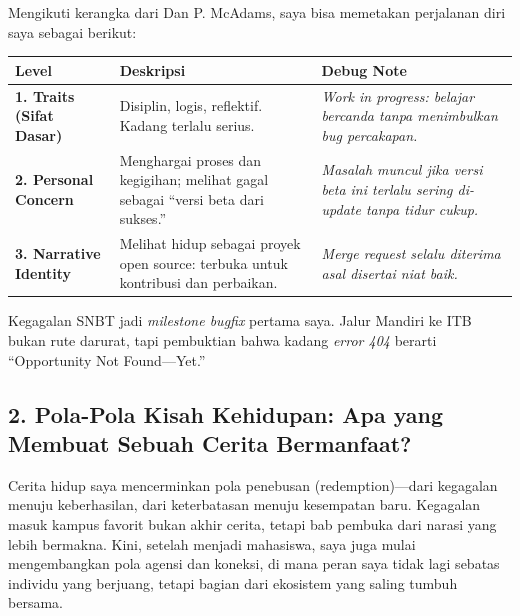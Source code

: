 \documentclass[
  letterpaper,
  DIV=11,
  numbers=noendperiod]{scrreprt}
\begin{document}
Mengikuti kerangka dari Dan P. McAdams, saya bisa memetakan perjalanan
diri saya sebagai berikut:

\begin{longtable}[]{@{}
  >{\raggedright\arraybackslash}p{}
  >{\raggedright\arraybackslash}p{}
  >{\raggedright\arraybackslash}p{}@{}}
\toprule\noalign{}
\begin{minipage}[b]{\linewidth}\raggedright
Level
\end{minipage} & \begin{minipage}[b]{\linewidth}\raggedright
Deskripsi
\end{minipage} & \begin{minipage}[b]{\linewidth}\raggedright
Debug Note
\end{minipage} \\
\midrule\noalign{}
\endhead
\bottomrule\noalign{}
\endlastfoot
\textbf{1. Traits (Sifat Dasar)} & Disiplin, logis, reflektif. Kadang
terlalu serius. & \emph{Work in progress: belajar bercanda tanpa
menimbulkan bug percakapan.} \\
\textbf{2. Personal Concern} & Menghargai proses dan kegigihan; melihat
gagal sebagai ``versi beta dari sukses.'' & \emph{Masalah muncul jika
versi beta ini terlalu sering di-update tanpa tidur cukup.} \\
\textbf{3. Narrative Identity} & Melihat hidup sebagai proyek open
source: terbuka untuk kontribusi dan perbaikan. & \emph{Merge request
selalu diterima asal disertai niat baik.} \\
\end{longtable}

Kegagalan SNBT jadi \emph{milestone bugfix} pertama saya. Jalur Mandiri
ke ITB bukan rute darurat, tapi pembuktian bahwa kadang \emph{error 404}
berarti ``Opportunity Not Found---Yet.''

\subsection{\texorpdfstring{\textbf{2. Pola-Pola Kisah Kehidupan: Apa
yang Membuat Sebuah Cerita
Bermanfaat?}}{2. Pola-Pola Kisah Kehidupan: Apa yang Membuat Sebuah Cerita Bermanfaat?}}\label{pola-pola-kisah-kehidupan-apa-yang-membuat-sebuah-cerita-bermanfaat}

Cerita hidup saya mencerminkan pola penebusan (redemption)---dari
kegagalan menuju keberhasilan, dari keterbatasan menuju kesempatan baru.
Kegagalan masuk kampus favorit bukan akhir cerita, tetapi bab pembuka
dari narasi yang lebih bermakna. Kini, setelah menjadi mahasiswa, saya
juga mulai mengembangkan pola agensi dan koneksi, di mana peran saya
tidak lagi sebatas individu yang berjuang, tetapi bagian dari ekosistem
yang saling tumbuh bersama.
\end{document}
